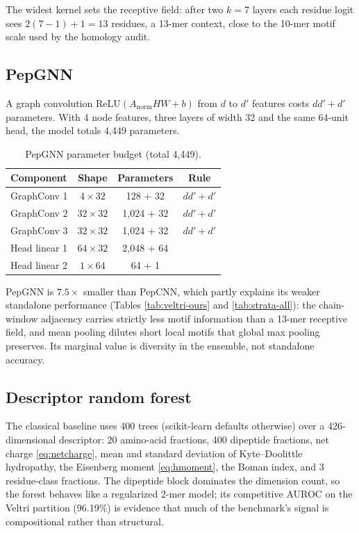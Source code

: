 The widest kernel sets the receptive field: after two $k{=}7$ layers each
residue logit sees $2(7-1)+1 = 13$ residues, a 13-mer context, close to
the 10-mer motif scale used by the homology audit.

\subsection{PepGNN}
A graph convolution $\mathrm{ReLU}(A_{\mathrm{norm}} H W + b)$ from $d$ to
$d'$ features costs $d d' + d'$ parameters. With 4 node features, three
layers of width 32 and the same 64-unit head, the model totals 4{,}449
parameters.

\begin{table}[h]\centering\small
\caption{PepGNN parameter budget (total 4{,}449).}
\label{tab:gnnparams}
\begin{tabular}{lccc}
\hline
Component & Shape & Parameters & Rule \\
\hline
GraphConv 1 & $4 \times 32$ & 128 + 32 & $dd' + d'$ \\
GraphConv 2 & $32 \times 32$ & 1{,}024 + 32 & $dd' + d'$ \\
GraphConv 3 & $32 \times 32$ & 1{,}024 + 32 & $dd' + d'$ \\
Head linear 1 & $64 \times 32$ & 2{,}048 + 64 & \\
Head linear 2 & $1 \times 64$ & 64 + 1 & \\
\hline
\end{tabular}
\end{table}

PepGNN is $7.5\times$ smaller than PepCNN, which partly explains its weaker
standalone performance (Tables \ref{tab:veltri-ours} and
\ref{tab:strata-all}): the chain-window adjacency carries strictly less
motif information than a 13-mer receptive field, and mean pooling dilutes
short local motifs that global max pooling preserves. Its marginal value
is diversity in the ensemble, not standalone accuracy.

\subsection{Descriptor random forest}
The classical baseline uses 400 trees (scikit-learn defaults otherwise)
over a 426-dimensional descriptor: 20 amino-acid fractions, 400 dipeptide
fractions, net charge \eqref{eq:netcharge}, mean and standard deviation of
Kyte--Doolittle hydropathy, the Eisenberg moment \eqref{eq:hmoment}, the
Boman index, and 3 residue-class fractions. The dipeptide block dominates
the dimension count, so the forest behaves like a regularized 2-mer model;
its competitive AUROC on the Veltri partition (96.19\%) is evidence that
much of the benchmark's signal is compositional rather than structural.
